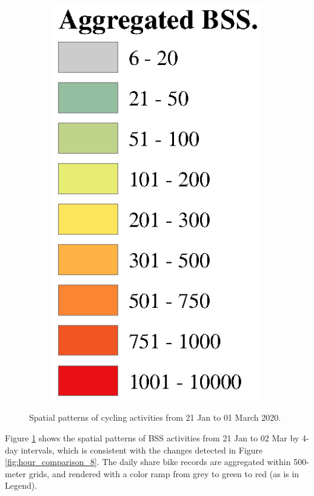 \documentclass[preprints,ijgi,submit,moreauthors]{Definitions/mdpi}
\begin{document}
\begin{figure}[ht]
\begin{subfigure}{.13\textwidth}
        \includegraphics[width=\textwidth]{Figures/Overall_spatial_patterns/legend5.eps}
    \end{subfigure}
    \caption{Spatial patterns of cycling activities from 21 Jan to 01 March 2020.}
    \label{fig:full_spatial_pattern_2020}
\end{figure}

Figure \ref{fig:full_spatial_pattern_2020} shows the spatial patterns of BSS activities from 21 Jan to 02 Mar by 4-day intervals, which is consistent with the changes detected in Figure \ref{fig:hour_comparison_8}. %
The daily share bike records are aggregated within 500-meter grids, and rendered with a color ramp from grey to green to red (as is in Legend).
\end{document}
